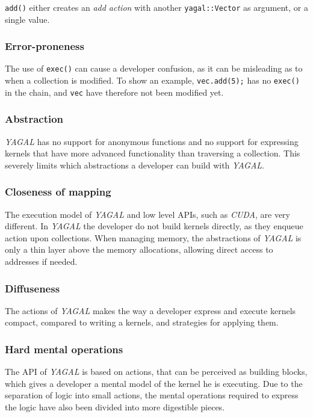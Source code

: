 \texttt{add()} either creates an \textit{add action} with another \texttt{yagal::Vector} as argument, or a single value.

\subsubsection[*]{Error-proneness}
The use of \texttt{exec()} can cause a developer confusion, as it can be misleading as to when a collection is modified. To show an example,
\texttt{vec.add(5);} has no \texttt{exec()} in the chain, and \texttt{vec} have therefore not been modified yet.

\subsubsection[*]{Abstraction}
\textit{YAGAL} has no support for anonymous functions and no support for expressing kernels that have more advanced functionality than traversing a collection. This severely limits which abstractions a developer can build with \textit{YAGAL}.

\subsubsection[*]{Closeness of mapping}
The execution model of \textit{YAGAL} and low level APIs, such as \textit{CUDA}, are very different. In \textit{YAGAL} the developer do not build kernels directly, as they enqueue action upon collections. When managing memory, the abstractions of \textit{YAGAL} is only a thin layer above the memory allocations, allowing direct access to addresses if needed.

\subsubsection[*]{Diffuseness}
The actions of \textit{YAGAL} makes the way a developer express and execute kernels compact, compared to writing a kernels, and strategies for applying them.

\subsubsection[*]{Hard mental operations}
The API of \textit{YAGAL} is based on actions, that can be perceived as building blocks, which gives a developer a mental model of the kernel he is executing. Due to the separation of logic into small actions, the mental operations required to express the logic have also been divided into more digestible pieces.

